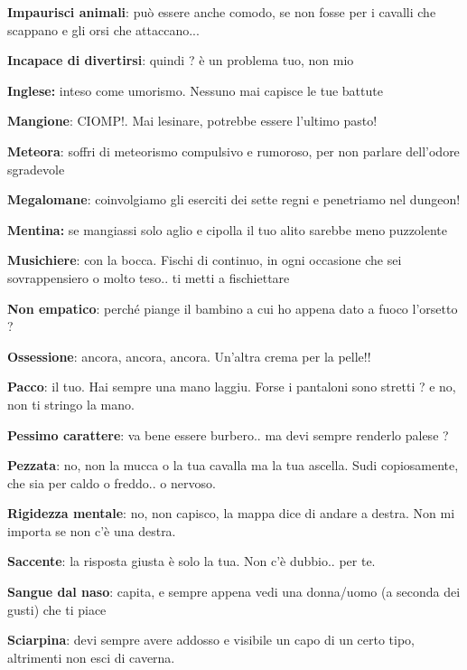 \documentclass[a4paper,11pt,twoside,openany]{book}
\begin{document}
{\textbf{Impaurisci animali}: può essere anche comodo, se non fosse per i cavalli che scappano e gli orsi che attaccano...

\textbf{Incapace di divertirsi}: quindi ? è un problema tuo, non mio

\textbf{Inglese:} inteso come umorismo. Nessuno mai capisce le tue battute

\textbf{Mangione}: CIOMP!. Mai lesinare, potrebbe essere l'ultimo pasto!

\textbf{Meteora}: soffri di meteorismo compulsivo e rumoroso, per non parlare dell'odore sgradevole

\textbf{Megalomane}: coinvolgiamo gli eserciti dei sette regni e penetriamo nel dungeon!

\textbf{Mentina:} se mangiassi solo aglio e cipolla il tuo alito sarebbe meno puzzolente

\textbf{Musichiere}: con la bocca. Fischi di continuo, in ogni occasione che sei sovrappensiero o molto teso.. ti metti a fischiettare

\textbf{Non empatico}: perché piange il bambino a cui ho appena dato a fuoco l'orsetto ?

\textbf{Ossessione}: ancora, ancora, ancora. Un'altra crema per la pelle!!

\textbf{Pacco}: il tuo. Hai sempre una mano laggiu. Forse i pantaloni sono stretti ? e no, non ti stringo la mano.

\textbf{Pessimo carattere}: va bene essere burbero.. ma devi sempre renderlo palese ?

\textbf{Pezzata}: no, non la mucca o la tua cavalla ma la tua ascella. Sudi copiosamente, che sia per caldo o freddo.. o nervoso.

\textbf{Rigidezza mentale}: no, non capisco, la mappa dice di andare a destra. Non mi importa se non c'è una destra.

\textbf{Saccente}: la risposta giusta è solo la tua. Non c'è dubbio.. per te.

\textbf{Sangue dal naso}: capita, e sempre appena vedi una donna/uomo (a seconda dei gusti) che ti piace

\textbf{Sciarpina}: devi sempre avere addosso e visibile un capo di un certo tipo, altrimenti non esci di caverna.

}
\end{document}
